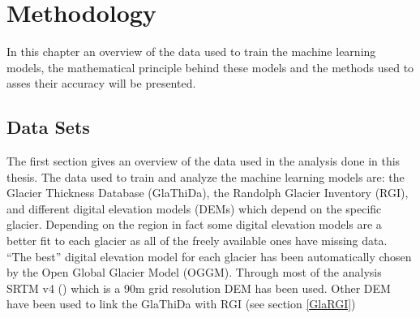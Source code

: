 \chapter{Methodology}\label{chap2}
\thispagestyle{plain}
In this chapter an overview of the data used to train the machine learning models, the mathematical principle behind these models and the methods used to asses their accuracy will be presented. 





\section{Data Sets}\label{glathida}
The first section gives an overview of the data used in the analysis done in this thesis. The data used to train and analyze the machine learning models are: the Glacier Thickness Database (GlaThiDa), the Randolph Glacier Inventory (RGI), and different digital elevation models (DEMs) which depend on the specific glacier. Depending on the region in fact some digital elevation models are a better fit to each glacier as all of the freely available ones have missing data. ``The best'' digital elevation model for each glacier has been automatically chosen by the Open Global Glacier Model (OGGM). Through most of the analysis SRTM v4 (\citet{SRTM}) which is a 90m grid resolution DEM has been used. Other DEM have been used to link the GlaThiDa with RGI (see section \ref{GlaRGI})

